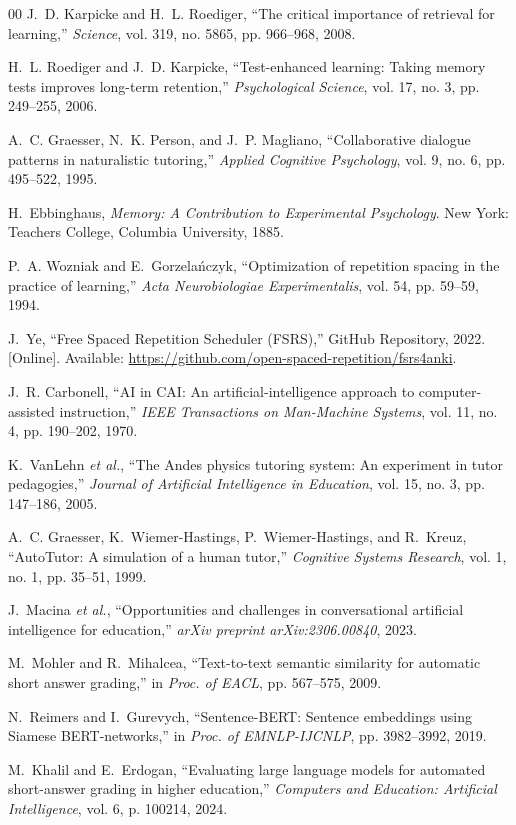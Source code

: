 \documentclass[conference]{IEEEtran}
\begin{document}
\begin{thebibliography}{00}
J.~D. Karpicke and H.~L. Roediger, ``The critical importance of retrieval for learning,'' \textit{Science}, vol. 319, no. 5865, pp. 966--968, 2008.

H.~L. Roediger and J.~D. Karpicke, ``Test-enhanced learning: Taking memory tests improves long-term retention,'' \textit{Psychological Science}, vol. 17, no. 3, pp. 249--255, 2006.

A.~C. Graesser, N.~K. Person, and J.~P. Magliano, ``Collaborative dialogue patterns in naturalistic tutoring,'' \textit{Applied Cognitive Psychology}, vol. 9, no. 6, pp. 495--522, 1995.

H.~Ebbinghaus, \textit{Memory: A Contribution to Experimental Psychology}. New York: Teachers College, Columbia University, 1885.

P.~A. Wozniak and E.~Gorzela{\'n}czyk, ``Optimization of repetition spacing in the practice of learning,'' \textit{Acta Neurobiologiae Experimentalis}, vol. 54, pp. 59--59, 1994.

J.~Ye, ``Free Spaced Repetition Scheduler (FSRS),'' GitHub Repository, 2022. [Online]. Available: \url{https://github.com/open-spaced-repetition/fsrs4anki}.

J.~R. Carbonell, ``AI in CAI: An artificial-intelligence approach to computer-assisted instruction,'' \textit{IEEE Transactions on Man-Machine Systems}, vol. 11, no. 4, pp. 190--202, 1970.

K.~VanLehn \textit{et al.}, ``The Andes physics tutoring system: An experiment in tutor pedagogies,'' \textit{Journal of Artificial Intelligence in Education}, vol. 15, no. 3, pp. 147--186, 2005.

A.~C. Graesser, K.~Wiemer-Hastings, P.~Wiemer-Hastings, and R.~Kreuz, ``AutoTutor: A simulation of a human tutor,'' \textit{Cognitive Systems Research}, vol. 1, no. 1, pp. 35--51, 1999.

J.~Macina \textit{et al.}, ``Opportunities and challenges in conversational artificial intelligence for education,'' \textit{arXiv preprint arXiv:2306.00840}, 2023.

M.~Mohler and R.~Mihalcea, ``Text-to-text semantic similarity for automatic short answer grading,'' in \textit{Proc. of EACL}, pp. 567--575, 2009.

N.~Reimers and I.~Gurevych, ``Sentence-BERT: Sentence embeddings using Siamese BERT-networks,'' in \textit{Proc. of EMNLP-IJCNLP}, pp. 3982--3992, 2019.

M.~Khalil and E.~Erdogan, ``Evaluating large language models for automated short-answer grading in higher education,'' \textit{Computers and Education: Artificial Intelligence}, vol. 6, p. 100214, 2024.
\end{thebibliography}
\end{document}
